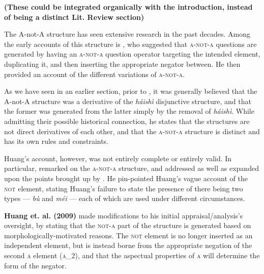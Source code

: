 \documentclass[12pt, UTF8]{article}
\begin{document}
\textbf{(These could be integrated organically with the introduction, instead of being a distinct Lit. Review section)}



The A-not-A structure has seen extensive research in the past decades. Among the early accounts of this structure is \cite{Huang1991}, who suggested that \textsc{a-not-a} questions are generated by having an \textsc{a-not-a} question operator targeting the intended element, duplicating it, and then inserting the appropriate negator between. He then provided an account of the different variations of \textsc{a-not-a}.

As we have seen in an earlier section, prior to \cite{Huang1991}, it was generally believed that the A-not-A structure was a derivative of the \textit{h\'{a}ish\`{i}} disjunctive structure, and that the former was generated from the latter simply by the removal of \textit{h\'{a}ish\`{i}}. While admitting their possible historical connection, he states that the structures are not direct derivatives of each other, and that the \textsc{a-not-a} structure is distinct and has its own rules and constraints.


Huang's account, however, was not entirely complete or entirely valid. In particular, \cite{McCawley1994} remarked on the \textsc{a-not-a} structure, and addressed as well as expanded upon the points brought up by \cite{Huang1991}. He pin-pointed Huang's vague account of the \textsc{not} element, stating Huang's failure to state the presence of there being two types --- \textit{b\`{u}} and \textit{m\'{e}i} --- each of which are used under different circumstances.

\textbf{Huang et. al. (2009)} made modifications to his initial appraisal/analysis's oversight, by stating that the \textsc{not-a} part of the structure is generated based on morphologically-motivated reasons. The \textsc{not} element is no longer inserted as an independent element, but is instead borne from the appropriate negation of the second \textsc{a} element (\textsc{a_2}), and that the aspectual properties of \textsc{a} will determine the form of the negator.
\end{document}
